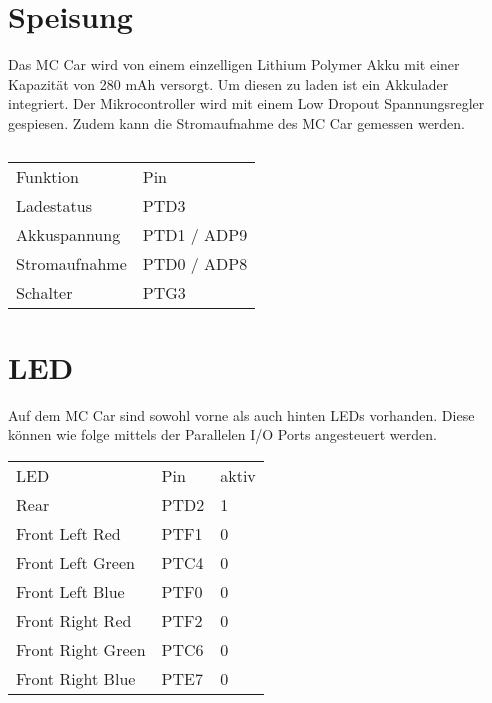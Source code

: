 \documentclass[a4paper,10pt,fleqn]{article}
\begin{document}
\section{Speisung}
Das MC Car wird von einem einzelligen Lithium Polymer Akku mit einer Kapazität 
von 280 mAh versorgt. Um diesen zu laden ist ein Akkulader integriert. Der 
Mikrocontroller wird mit einem Low Dropout Spannungsregler gespiesen. Zudem 
kann die Stromaufnahme des MC Car gemessen werden. 
\begin{table}[h!]
\begin{tabular}{ll}
\rowcolor{white} Funktion       & Pin           \\
\rowcolor{lgray} Ladestatus     & PTD3          \\
\rowcolor{white} Akkuspannung   & PTD1 / ADP9   \\
\rowcolor{lgray} Stromaufnahme  & PTD0 / ADP8   \\
\rowcolor{white} Schalter       & PTG3          \\
\end{tabular}
\caption{}
\end{table}

\section{LED}
Auf dem MC Car sind sowohl vorne als auch hinten LEDs vorhanden. Diese können 
wie folge mittels der Parallelen I/O Ports angesteuert werden. \\
\begin{table}[h!]
\begin{tabular}{lll}
\rowcolor{white} LED                 & Pin   & aktiv \\
\rowcolor{lgray} Rear                & PTD2  & 1     \\
\rowcolor{white} Front Left  Red     & PTF1  & 0     \\
\rowcolor{lgray} Front Left  Green   & PTC4  & 0     \\
\rowcolor{white} Front Left  Blue    & PTF0  & 0     \\
\rowcolor{lgray} Front Right Red     & PTF2  & 0     \\
\rowcolor{white} Front Right Green   & PTC6  & 0     \\
\rowcolor{lgray} Front Right Blue    & PTE7  & 0     \\
\end{tabular}
\end{table}
\end{document}
